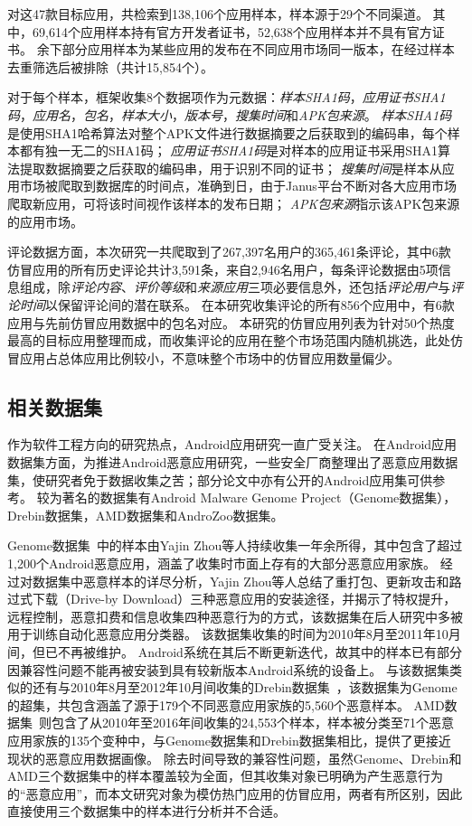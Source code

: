 对这47款目标应用，\mytool 共检索到138,106个应用样本，样本源于29个不同渠道。
其中，69,614个应用样本持有官方开发者证书，52,638个应用样本并不具有官方证书。
余下部分应用样本为某些应用的发布在不同应用市场同一版本，在经过样本去重筛选后被排除（共计15,854个）。

对于每个样本，框架收集8个数据项作为元数据：\emph{样本SHA1码}，\emph{应用证书SHA1码}，\emph{应用名}，\emph{包名}，\emph{样本大小}，\emph{版本号}，\emph{搜集时间}和\emph{APK包来源}。
\emph{样本SHA1码}是使用SHA1哈希算法对整个APK文件进行数据摘要之后获取到的编码串，每个样本都有独一无二的SHA1码；
\emph{应用证书SHA1码}是对样本的应用证书采用SHA1算法提取数据摘要之后获取的编码串，用于识别不同的证书；
\emph{搜集时间}是样本从应用市场被爬取到数据库的时间点，准确到日，由于Janus平台不断对各大应用市场爬取新应用，可将该时间视作该样本的发布日期；
\emph{APK包来源}指示该APK包来源的应用市场。

评论数据方面，本次研究一共爬取到了267,397名用户的365,461条评论，其中6款仿冒应用的所有历史评论共计3,591条，来自2,946名用户，每条评论数据由5项信息组成，除\emph{评论内容}、\emph{评价等级}和\emph{来源应用}三项必要信息外，还包括\emph{评论用户}与\emph{评论时间}以保留评论间的潜在联系。
在本研究收集评论的所有856个应用中，有6款应用与先前仿冒应用数据中的包名对应。
本研究的仿冒应用列表为针对50个热度最高的目标应用整理而成，而收集评论的应用在整个市场范围内随机挑选，此处仿冒应用占总体应用比例较小，不意味整个市场中的仿冒应用数量偏少。


\subsection{相关数据集}

作为软件工程方向的研究热点，Android应用研究一直广受关注。
在Android应用数据集方面，为推进Android恶意应用研究，一些安全厂商整理出了恶意应用数据集，使研究者免于数据收集之苦；部分论文中亦有公开的Android应用集可供参考。
较为著名的数据集有Android Malware Genome Project（Genome数据集），Drebin数据集，AMD数据集和AndroZoo数据集。

Genome数据集~\cite{Zhou2012DissectingAM}中的样本由Yajin Zhou等人持续收集一年余所得，其中包含了超过1,200个Android恶意应用，涵盖了收集时市面上存有的大部分恶意应用家族。
经过对数据集中恶意样本的详尽分析，Yajin Zhou等人总结了重打包、更新攻击和路过式下载（Drive-by Download）三种恶意应用的安装途径，并揭示了特权提升，远程控制，恶意扣费和信息收集四种恶意行为的方式，该数据集在后人研究中多被用于训练自动化恶意应用分类器。
该数据集收集的时间为2010年8月至2011年10月间，但已不再被维护。
Android系统在其后不断更新迭代，故其中的样本已有部分因兼容性问题不能再被安装到具有较新版本Android系统的设备上。
与该数据集类似的还有与2010年8月至2012年10月间收集的Drebin数据集~\cite{arp2014drebin}，该数据集为Genome的超集，共包含涵盖了源于179个不同恶意应用家族的5,560个恶意样本。
AMD数据集~\cite{li2017android}则包含了从2010年至2016年间收集的24,553个样本，样本被分类至71个恶意应用家族的135个变种中，与Genome数据集和Drebin数据集相比，提供了更接近现状的恶意应用数据画像。
除去时间导致的兼容性问题，虽然Genome、Drebin和AMD三个数据集中的样本覆盖较为全面，但其收集对象已明确为产生恶意行为的``恶意应用''，而本文研究对象为模仿热门应用的仿冒应用，两者有所区别，因此直接使用三个数据集中的样本进行分析并不合适。

